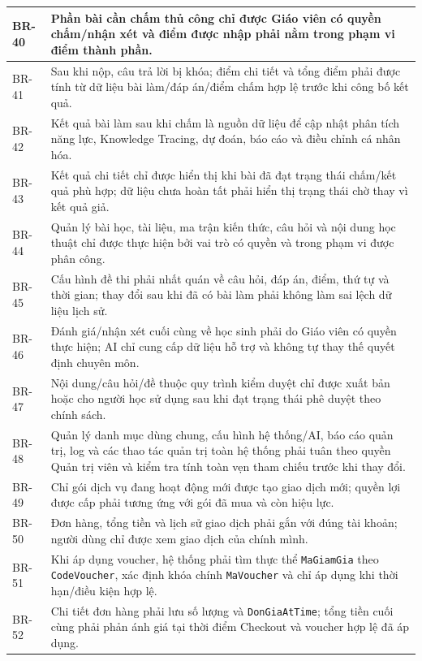 \documentclass[12pt,a4paper,oneside]{report}
\begin{document}
\begin{longtable}{|p{1.6cm}|p{12.7cm}|}
BR-40 & Phần bài cần chấm thủ công chỉ được Giáo viên có quyền chấm/nhận xét và điểm được nhập phải nằm trong phạm vi điểm thành phần. \\ \hline
BR-41 & Sau khi nộp, câu trả lời bị khóa; điểm chi tiết và tổng điểm phải được tính từ dữ liệu bài làm/đáp án/điểm chấm hợp lệ trước khi công bố kết quả. \\ \hline
BR-42 & Kết quả bài làm sau khi chấm là nguồn dữ liệu để cập nhật phân tích năng lực, Knowledge Tracing, dự đoán, báo cáo và điều chỉnh cá nhân hóa. \\ \hline
BR-43 & Kết quả chi tiết chỉ được hiển thị khi bài đã đạt trạng thái chấm/kết quả phù hợp; dữ liệu chưa hoàn tất phải hiển thị trạng thái chờ thay vì kết quả giả. \\ \hline
BR-44 & Quản lý bài học, tài liệu, ma trận kiến thức, câu hỏi và nội dung học thuật chỉ được thực hiện bởi vai trò có quyền và trong phạm vi được phân công. \\ \hline
BR-45 & Cấu hình đề thi phải nhất quán về câu hỏi, đáp án, điểm, thứ tự và thời gian; thay đổi sau khi đã có bài làm phải không làm sai lệch dữ liệu lịch sử. \\ \hline
BR-46 & Đánh giá/nhận xét cuối cùng về học sinh phải do Giáo viên có quyền thực hiện; AI chỉ cung cấp dữ liệu hỗ trợ và không tự thay thế quyết định chuyên môn. \\ \hline
BR-47 & Nội dung/câu hỏi/đề thuộc quy trình kiểm duyệt chỉ được xuất bản hoặc cho người học sử dụng sau khi đạt trạng thái phê duyệt theo chính sách. \\ \hline
BR-48 & Quản lý danh mục dùng chung, cấu hình hệ thống/AI, báo cáo quản trị, log và các thao tác quản trị toàn hệ thống phải tuân theo quyền Quản trị viên và kiểm tra tính toàn vẹn tham chiếu trước khi thay đổi. \\ \hline
BR-49 & Chỉ gói dịch vụ đang hoạt động mới được tạo giao dịch mới; quyền lợi được cấp phải tương ứng với gói đã mua và còn hiệu lực. \\ \hline
BR-50 & Đơn hàng, tổng tiền và lịch sử giao dịch phải gắn với đúng tài khoản; người dùng chỉ được xem giao dịch của chính mình. \\ \hline
BR-51 & Khi áp dụng voucher, hệ thống phải tìm thực thể \texttt{MaGiamGia} theo \texttt{CodeVoucher}, xác định khóa chính \texttt{MaVoucher} và chỉ áp dụng khi thời hạn/điều kiện hợp lệ. \\ \hline
BR-52 & Chi tiết đơn hàng phải lưu số lượng và \texttt{DonGiaAtTime}; tổng tiền cuối cùng phải phản ánh giá tại thời điểm Checkout và voucher hợp lệ đã áp dụng. \\ \hline

\end{longtable}
\end{document}
